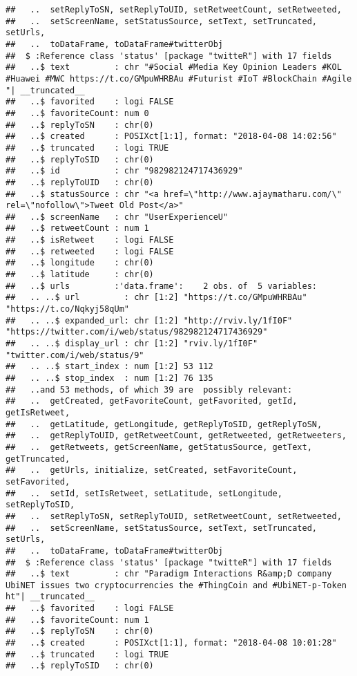 \documentclass[]{article}
\begin{document}
\begin{verbatim}
##   ..  setReplyToSN, setReplyToUID, setRetweetCount, setRetweeted,
##   ..  setScreenName, setStatusSource, setText, setTruncated, setUrls,
##   ..  toDataFrame, toDataFrame#twitterObj
##  $ :Reference class 'status' [package "twitteR"] with 17 fields
##   ..$ text         : chr "#Social #Media Key Opinion Leaders #KOL #Huawei #MWC https://t.co/GMpuWHRBAu #Futurist #IoT #BlockChain #Agile"| __truncated__
##   ..$ favorited    : logi FALSE
##   ..$ favoriteCount: num 0
##   ..$ replyToSN    : chr(0) 
##   ..$ created      : POSIXct[1:1], format: "2018-04-08 14:02:56"
##   ..$ truncated    : logi TRUE
##   ..$ replyToSID   : chr(0) 
##   ..$ id           : chr "982982124717436929"
##   ..$ replyToUID   : chr(0) 
##   ..$ statusSource : chr "<a href=\"http://www.ajaymatharu.com/\" rel=\"nofollow\">Tweet Old Post</a>"
##   ..$ screenName   : chr "UserExperienceU"
##   ..$ retweetCount : num 1
##   ..$ isRetweet    : logi FALSE
##   ..$ retweeted    : logi FALSE
##   ..$ longitude    : chr(0) 
##   ..$ latitude     : chr(0) 
##   ..$ urls         :'data.frame':    2 obs. of  5 variables:
##   .. ..$ url         : chr [1:2] "https://t.co/GMpuWHRBAu" "https://t.co/Nqkyj58qUm"
##   .. ..$ expanded_url: chr [1:2] "http://rviv.ly/1fI0F" "https://twitter.com/i/web/status/982982124717436929"
##   .. ..$ display_url : chr [1:2] "rviv.ly/1fI0F" "twitter.com/i/web/status/9"
##   .. ..$ start_index : num [1:2] 53 112
##   .. ..$ stop_index  : num [1:2] 76 135
##   ..and 53 methods, of which 39 are  possibly relevant:
##   ..  getCreated, getFavoriteCount, getFavorited, getId, getIsRetweet,
##   ..  getLatitude, getLongitude, getReplyToSID, getReplyToSN,
##   ..  getReplyToUID, getRetweetCount, getRetweeted, getRetweeters,
##   ..  getRetweets, getScreenName, getStatusSource, getText, getTruncated,
##   ..  getUrls, initialize, setCreated, setFavoriteCount, setFavorited,
##   ..  setId, setIsRetweet, setLatitude, setLongitude, setReplyToSID,
##   ..  setReplyToSN, setReplyToUID, setRetweetCount, setRetweeted,
##   ..  setScreenName, setStatusSource, setText, setTruncated, setUrls,
##   ..  toDataFrame, toDataFrame#twitterObj
##  $ :Reference class 'status' [package "twitteR"] with 17 fields
##   ..$ text         : chr "Paradigm Interactions R&amp;D company UbiNET issues two cryptocurrencies the #ThingCoin and #UbiNET-p-Token ht"| __truncated__
##   ..$ favorited    : logi FALSE
##   ..$ favoriteCount: num 1
##   ..$ replyToSN    : chr(0) 
##   ..$ created      : POSIXct[1:1], format: "2018-04-08 10:01:28"
##   ..$ truncated    : logi TRUE
##   ..$ replyToSID   : chr(0) 

\end{verbatim}
\end{document}
